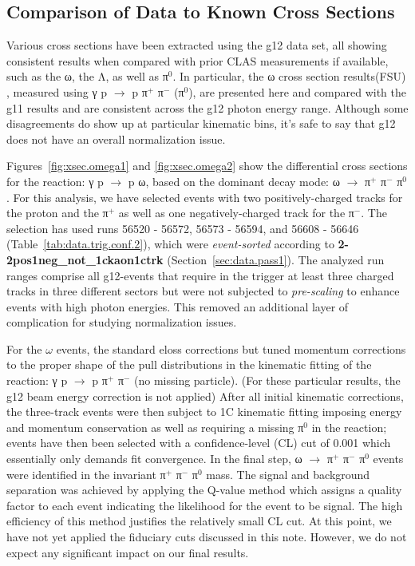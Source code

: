 \subsection{\label{sec:xsec}Comparison of Data to Known Cross Sections}

Various cross sections have been extracted using the g12 data set, all showing consistent results when compared with prior CLAS measurements if available, such as the ω, the Λ, as well as π$^0$. In particular, the ω cross section results(FSU) , measured using γ p $\rightarrow$ p π$^+$ π$^-$ (π$^0$), are presented here and compared with the g11 results and are consistent across the g12 photon energy range. Although some disagreements do show up at particular kinematic bins, it's safe to say that g12 does not have an overall normalization issue.

Figures~\ref{fig:xsec.omega1} and \ref{fig:xsec.omega2} show the differential cross sections for the reaction: γ p $\rightarrow$ p ω, based on the dominant decay mode: ω $\rightarrow$ π$^+$ π$^-$ π$^0$. For this analysis, we have selected events with two positively-charged tracks for the proton and the π$^+$ as well as one negatively-charged track for the π$^-$. The selection has used runs 56520 - 56572, 56573 - 56594, and 56608 - 56646 (Table~\ref{tab:data.trig.conf.2}), which were {\it event-sorted} according to {\bf 2-2pos1neg\_not\_1ckaon1ctrk} (Section~\ref{sec:data.pass1}). The analyzed run ranges comprise all g12-events that require in the trigger at least three charged tracks in three different sectors but were not subjected to {\it pre-scaling} to enhance events with high photon energies. This removed an additional layer of complication for studying normalization issues.

For the $\omega$ events, the standard {\sc eloss} corrections but tuned momentum corrections to the proper shape of the pull distributions in the kinematic fitting of the reaction: γ p $\rightarrow$ p π$^+$ π$^-$ (no missing particle). (For these particular results, the g12 beam energy correction is not applied) After all initial kinematic corrections, the three-track events were then subject to 1C kinematic fitting imposing energy and momentum conservation as well as requiring a missing π$^0$ in the reaction; events have then been selected with a confidence-level (CL) cut of 0.001 which essentially only demands fit convergence. In the final step, ω $\rightarrow$ π$^+$ π$^-$ π$^0$ events were identified in the invariant π$^+$ π$^-$ π$^0$ mass. The signal and background separation was achieved by applying the Q-value method which assigns a quality factor to each event indicating the likelihood for the event to be signal. The high efficiency of this method justifies the relatively small CL cut. At this point, we have not yet applied the fiduciary cuts discussed in this note. However, we do not expect any significant impact on our final results.

